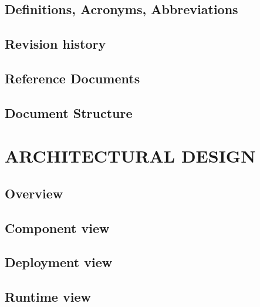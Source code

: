 \documentclass[11pt]{report}
\begin{document}
		\section{Definitions, Acronyms, Abbreviations}
		\label{sect:Definitions, Acronyms, Abbreviations}
			
			
			
			
		\section{Revision history}
		\label{sect:Revision history}
			
			
		\section{Reference Documents}
		\label{sect:Documents}
			
			
		\section{Document Structure}
		\label{sect:Document Structure}
			
			
	\chapter{ARCHITECTURAL DESIGN}
	\label{ch:ARCHITECTURAL DESIGN}
	
		\section{Overview}
		\label{sect:Overview}
			
			
		\section{Component view}
		\label{sect:Component view}
			
			
		\section{Deployment view}
		\label{sect:Deployment view}
			
			
		\section{Runtime view}
		\label{sect:Runtime view}
			
			
\end{document}
